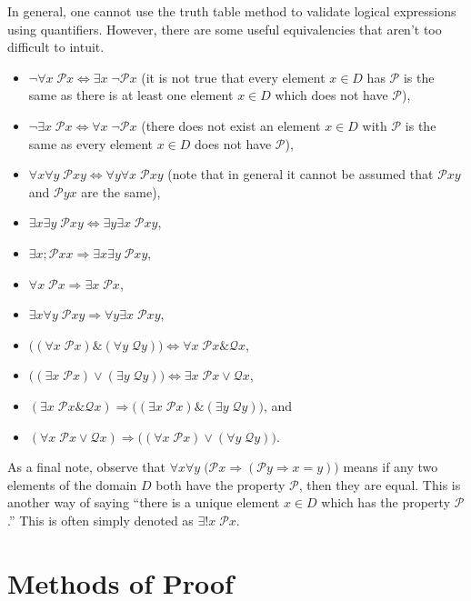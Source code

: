 \documentclass[a4paper,11pt]{article}
\newcommand{\PP}{\mathscr{P}}
\newcommand{\QQ}{\mathscr{Q}}
\begin{document}
In general, one cannot use the truth table method to validate logical
expressions using quantifiers. However, there are some useful equivalencies that
aren't too difficult to intuit. 
\begin{itemize}
\item $\neg\forall x\;\PP x \Leftrightarrow \exists x\;\neg\PP x$ (it is not
  true that every element $x \in D$ has $\PP$ is the same as there is at least
  one element $x \in D$ which does not have $\PP$),
\item $\neg\exists x\;\PP x \Leftrightarrow \forall x\;\neg\PP x$ (there does
  not exist an element $x \in D$ with $\PP$ is the same as every element $x \in
  D$ does not have $\PP$),
\item $\forall x\forall y\;\PP xy \Leftrightarrow \forall y\forall x\;\PP xy$
  (note that in general it cannot be assumed that $\PP xy$ and $\PP yx$ are the
  same),
\item $\exists x\exists y\;\PP xy \Leftrightarrow \exists y\exists x\;\PP xy$,
\item $\exists x;\PP xx \Rightarrow \exists x\exists y\;\PP xy$,
\item $\forall x\;\PP x \Rightarrow \exists x\;\PP x$,
\item $\exists x\forall y\;\PP xy \Rightarrow \forall y\exists x\;\PP xy$,
\item $\Big( (\forall x\;\PP x) \& (\forall y\;\QQ y) \Big) \Leftrightarrow
  \forall x\;\PP x \& \QQ x$,
\item $\Big( (\exists x\;\PP x)\vee(\exists y\;\QQ y) \Big) \Leftrightarrow
  \exists x\;\PP x \vee \QQ x$,
\item $(\exists x\;\PP x\&\QQ x) \Rightarrow \Big( (\exists x\;\PP x)\&(\exists
  y\;\QQ y) \Big)$, and
\item $(\forall x\;\PP x \vee \QQ x) \Rightarrow \Big( (\forall x\;\PP
  x)\vee(\forall y\;\QQ y) \Big)$.
\end{itemize}

As a final note, observe that $\forall x\forall y\;\Big( \PP x \Rightarrow (\PP
y \Rightarrow x=y) \Big)$ means if any two elements of the domain $D$ both have
the property $\PP$, then they are equal. This is another way of saying ``there
is a unique element $x \in D$ which has the property $\PP$.'' This is often
simply denoted as $\exists! x\;\PP x$.

\section{Methods of Proof}
\end{document}
